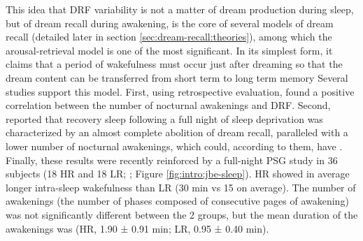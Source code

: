 This idea that DRF variability is not a matter of dream production during sleep, but of dream recall during awakening, is the core of several models of dream recall (detailed later in section \ref{sec:dream-recall:theories}), among which the arousal-retrieval model is one of the most significant. In its simplest form, it claims that a period of wakefulness must occur just after dreaming so that the dream content can be transferred from short term to long term memory \citep{koulack_dream_1976}
Several studies support this model. First, using retrospective evaluation, \citet{schredl_factors_2003} found a positive correlation between the number of nocturnal awakenings and DRF. Second, \citet{de_gennaro_recovery_2010} reported that recovery sleep following a full night of sleep deprivation was characterized by an almost complete abolition of dream recall, paralleled with a lower number of nocturnal awakenings, which could, according to them, have . Finally, these results were recently reinforced by a full-night PSG study in 36 subjects (18 HR and 18 LR; \citealp{eichenlaub_brain_2014}; Figure \ref{fig:intro:jbe-sleep}). HR showed in average longer intra-sleep wakefulness than LR (30 min vs 15 on average). The number of awakenings (the number of phases composed of consecutive pages of awakening) was not significantly different between the 2 groups, but the mean duration of the awakenings was (HR, 1.90 ± 0.91 min; LR, 0.95 ± 0.40 min).

